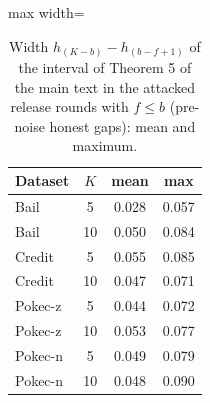 \begin{table}[tbp]
\centering
\footnotesize
\caption{Width $h_{(K-b)}-h_{(b-f+1)}$ of the interval of Theorem 5 of the main text in the attacked release rounds with $f\le b$ (pre-noise honest gaps): mean and maximum.}
\label{tab:s_spread}
\begin{adjustbox}{max width=\textwidth}
\begin{tabular}{lccc}
\toprule
Dataset & $K$ & mean & max \\
\midrule
Bail & 5 & 0.028 & 0.057 \\
Bail & 10 & 0.050 & 0.084 \\
Credit & 5 & 0.055 & 0.085 \\
Credit & 10 & 0.047 & 0.071 \\
Pokec-z & 5 & 0.044 & 0.072 \\
Pokec-z & 10 & 0.053 & 0.077 \\
Pokec-n & 5 & 0.049 & 0.079 \\
Pokec-n & 10 & 0.048 & 0.090 \\
\bottomrule
\end{tabular}
\end{adjustbox}
\end{table}
